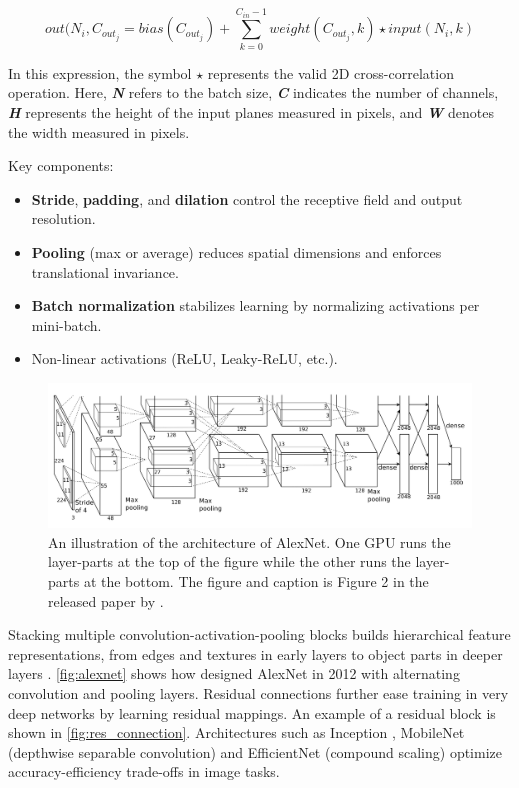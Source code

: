 \[out(N_i, C_{out_j}=bias(C_{out_j})+\sum_{k=0}^{C_{in}-1}weight(C_{out_j},k)\star input(N_i,k)\]

In this expression, the symbol \(\star\) represents the valid 2D cross-correlation operation. Here, \textit{\textbf{N}} refers to the batch size, \textit{\textbf{C}} indicates the number of channels, \textit{\textbf{H}} represents the height of the input planes measured in pixels, and \textit{\textbf{W}} denotes the width measured in pixels\cite{pytorch_conv2d}. 

Key components:
\begin{itemize}
    \item \textbf{Stride}, \textbf{padding}, and \textbf{dilation} control the receptive field and output resolution.
    \item \textbf{Pooling} (max or average) reduces spatial dimensions and enforces translational invariance.
    \item \textbf{Batch normalization} stabilizes learning by normalizing activations per mini-batch.
    \item Non-linear activations (ReLU, Leaky-ReLU, etc.). 
\end{itemize}

\begin{figure}
    \centering
    \includegraphics[width=1\linewidth]{figures/alexnet.png}
    \caption{An illustration of the architecture of AlexNet. One GPU runs the layer-parts at the top of the figure while the other runs the layer-parts at the bottom. The figure and caption is Figure 2 in the released paper by \textcite{krizhevsky_alexnet}.}
    \label{fig:alexnet}
\end{figure}

Stacking multiple convolution-activation-pooling blocks builds hierarchical feature representations, from edges and textures in early layers to object parts in deeper layers \cite{lecun_deep_learning_2015}. \autoref{fig:alexnet} shows how \textcite{krizhevsky_alexnet} designed AlexNet in 2012 with alternating convolution and pooling layers. Residual connections \cite{he_deep_residual_2015} further ease training in very deep networks by learning residual mappings. An example of a residual block is shown in \autoref{fig:res_connection}. Architectures such as Inception \cite{szegedy_going_2014}, MobileNet (depthwise separable convolution) \cite{howard_mobilenets_2017} and EfficientNet (compound scaling) \cite{tan_efficientnet_2020} optimize accuracy-efficiency trade-offs in image tasks. 

